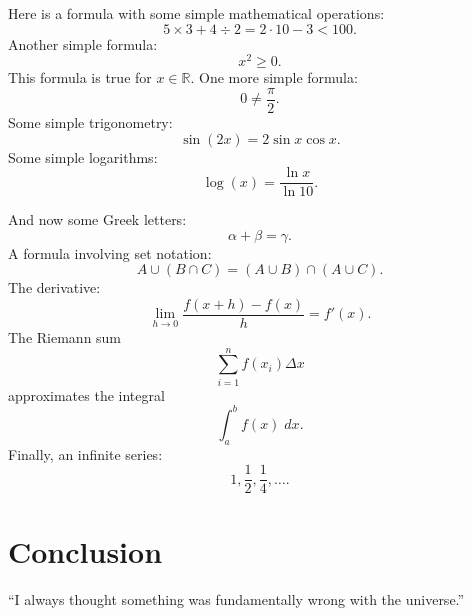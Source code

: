 
Here is a formula with some simple mathematical operations:
\[5 \times 3 + 4 \div 2 = 2 \cdot 10 - 3 < 100.\]
Another simple formula:
\[x^{2} \geq 0.\]		%
This formula is true for $x \in \mathbb{R}$.	%
One more simple formula:
\[0 \neq \frac{\pi}{2}.\]
Some simple trigonometry:
\[\sin(2x) = 2 \sin x \cos x.\]
Some simple logarithms:
\[\log(x) = \frac{\ln x}{\ln 10}.\]


And now some Greek letters:
\[\alpha + \beta = \gamma.\]
A formula involving set notation:
\[A \cup (B \cap C) = (A \cup B) \cap (A \cup C).\]
The derivative:
\[\lim_{h \rightarrow 0}\frac{f(x + h) - f(x)}{h} = f'(x).\]
The Riemann sum
\[\sum_{i = 1}^{n}f(x_{i})\Delta x\]
approximates the integral
\[\int_{a}^{b}f(x)\;dx.\]		%
Finally, an infinite series:
\[1, \frac{1}{2}, \frac{1}{4}, \ldots.\] %





\section{Conclusion}
``I always thought something was fundamentally wrong with the universe.'' \cite{adams1995hitchhiker}

